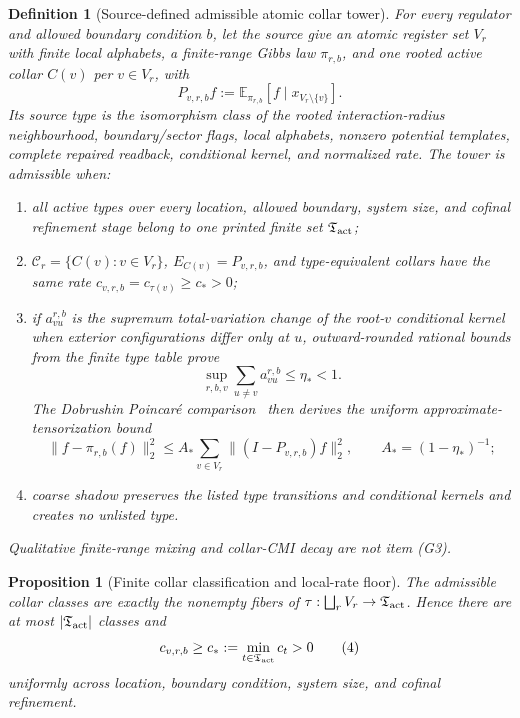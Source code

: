 \documentclass[11pt]{article}
\numberwithin{equation}{section}
\newtheorem{proposition}[theorem]{Proposition}
\newtheorem{definition}[theorem]{Definition}
\theoremstyle{remark}
\begin{document}
\begin{definition}[Source-defined admissible atomic collar tower]
\label{def:admissible-collar-tower}
For every regulator and allowed boundary condition \(b\), let the source give an atomic register
set \(V_r\) with finite local alphabets, a finite-range Gibbs law \(\pi_{r,b}\), and one rooted active collar \(C(v)\) per
\(v\in V_r\), with
\[
P_{v,r,b}f:=\mathbb E_{\pi_{r,b}}[f\mid x_{V_r\setminus\{v\}}].
\]
Its source type is the isomorphism class of the rooted interaction-radius neighbourhood,
boundary/sector flags, local alphabets, nonzero potential templates, complete repaired readback,
conditional kernel, and normalized rate.  The tower is admissible when:
\begin{enumerate}[label=\textup{(G\arabic*)},leftmargin=2em]
\item all active types over every location, allowed boundary, system size, and cofinal refinement
stage belong to one printed finite set \(\mathfrak T_{\rm act}\);
\item \(\mathcal C_r=\{C(v):v\in V_r\}\), \(E_{C(v)}=P_{v,r,b}\), and type-equivalent collars
have the same rate \(c_{v,r,b}=c_{\tau(v)}\ge c_*>0\);
\item if \(a_{vu}^{r,b}\) is the supremum total-variation change of the root-\(v\) conditional
kernel when exterior configurations differ only at \(u\), outward-rounded rational bounds from
the finite type table prove
\[
\sup_{r,b,v}\sum_{u\ne v}a_{vu}^{r,b}\le\eta_*<1.
\tag{3}
\]
The Dobrushin Poincar\'e comparison~\cite{wu06} then derives the uniform
approximate-tensorization bound
\[
\|f-\pi_{r,b}(f)\|_2^2\le A_*\sum_{v\in V_r}\|(I-P_{v,r,b})f\|_2^2,
\qquad A_*=(1-\eta_*)^{-1};
\tag{AT}
\]
\item coarse shadow preserves the listed type transitions and conditional kernels and creates no
unlisted type.
\end{enumerate}
Qualitative finite-range mixing and collar-CMI decay are not item \textup{(G3)}.
\end{definition}

\begin{proposition}[Finite collar classification and local-rate floor]
\label{lem:floor}
The admissible collar classes are exactly the nonempty fibers of
\(\tau:\bigsqcup_rV_r\to\mathfrak T_{\rm act}\).  Hence there are at most
\(|\mathfrak T_{\rm act}|\) classes and
\[
c_{v,r,b}\ge c_*:=\min_{t\in\mathfrak T_{\rm act}}c_t>0
\tag{4}
\]
uniformly across location, boundary condition, system size, and cofinal refinement.
\end{proposition}
\end{document}

